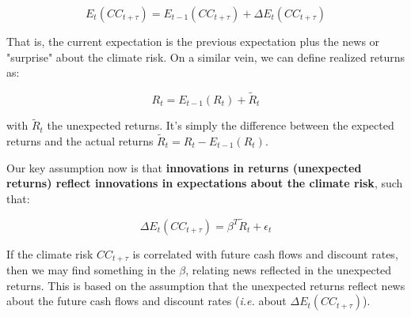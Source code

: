 \begin{equation}
    E_{t}(CC_{t+\tau}) = E_{t-1}(CC_{t+\tau}) + \Delta E_{t}(CC_{t+\tau})
\end{equation}

That is, the current expectation is the previous
expectation plus the news or "surprise" about the climate risk.
On a similar vein, we can define realized returns as:

\begin{equation}
    R_{t} = E_{t-1}(R_{t}) + \tilde{R}_{t}
\end{equation}

with $\tilde{R}_{t}$ the unexpected returns.
It's simply the difference between the 
expected returns and the actual returns
$\tilde{R}_{t} = R_{t} - E_{t-1}(R_{t})$.

Our key assumption now is that \textbf{innovations 
in returns (unexpected returns) reflect innovations
in expectations about the climate risk}, such that:

\begin{equation}
    \Delta E_{t}(CC_{t+\tau}) = \beta^T \tilde{R}_{t} + \epsilon_{t}
\end{equation}

If the climate risk $CC_{t+\tau}$ is correlated
with future cash flows and discount rates,
then we may find something in the $\beta$, relating
news reflected in the unexpected returns.
This is based on the assumption that the unexpected
returns reflect news about the future cash flows
and discount rates (\textit{i.e.} about
$\Delta E_{t}(CC_{t+\tau})$).








